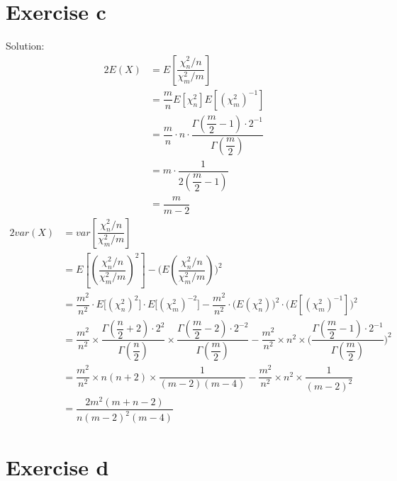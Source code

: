 \documentclass[a4papers]{ctexart}
\begin{document}
\section*{Exercise c}
\noindent Solution:\
\[  \]
\begin{alignat*}{2}
    E(X) 
    &= E\left[\dfrac{\chi^2_{n}/n}{\chi^2_{m}/m}\right] \\
    &= \dfrac{m}{n}E\left[\chi^2_{n} \right] E\left[ (\chi^2_{m})^{-1} \right] \\
    &= \dfrac{m}{n}\cdot n\cdot \dfrac{\Gamma(\dfrac{m}{2}-1)\cdot 2^{-1} }{\Gamma(\dfrac{m}{2})} \\
    &= m \cdot \dfrac{1}{2(\dfrac{m}{2}-1)}\\
    &= \dfrac{m}{m-2}
\end{alignat*}
\begin{alignat*}{2}
    var(X)
    &= var\left[\dfrac{\chi^2_{n}/n}{\chi^2_{m}/m} \right]\\
    &= E\left[\left(\dfrac{\chi^2_{n}/n}{\chi^2_{m}/m}\right)^2\right]-\Bigg(E\left(\dfrac{\chi^2_{n}/n}{\chi^2_{m}/m} \right)\Bigg)^2\\
    &=\dfrac{m^2}{n^2} \cdot E\Big[(\chi^2_n)^2\Big] \cdot E\Big[(\chi^2_m)^{-2} \Big]
        - \dfrac{m^2}{n^2}\cdot \Big(E(\chi^2_n) \Big)^2 \cdot \Big(E\left[(\chi^2_m)^{-1}\right] \Big)^2\\
    &=\dfrac{m^2}{n^2} \times \dfrac{\Gamma(\dfrac{n}{2}+2)\cdot 2^{2} }{\Gamma(\dfrac{n}{2})} \times \dfrac{\Gamma(\dfrac{m}{2}-2)\cdot 2^{-2} }{\Gamma(\dfrac{m}{2})} 
        - \dfrac{m^2}{n^2}\times n^2 \times \Big( \dfrac{\Gamma(\dfrac{m}{2}-1)\cdot 2^{-1} }{\Gamma(\dfrac{m}{2})}  \Big)^2\\
    &= \dfrac{m^2}{n^2} \times n(n+2) \times \dfrac{1}{(m-2)(m-4)}
        - \dfrac{m^2}{n^2} \times n^2 \times \dfrac{1}{(m-2)^2}\\
    &= \dfrac{2m^2(m+n-2)}{n(m-2)^2(m-4)}
\end{alignat*}


\section*{Exercise d}
\end{document}
